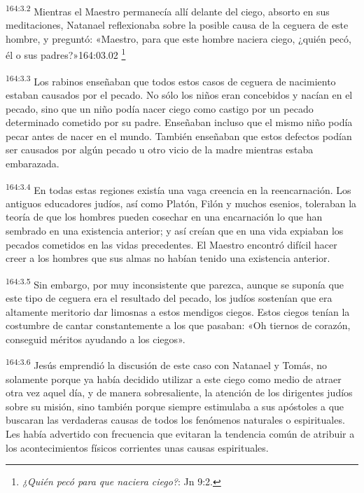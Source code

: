 \par 
\textsuperscript{164:3.2} Mientras el Maestro permanecía allí delante del ciego, absorto en sus meditaciones, Natanael reflexionaba sobre la posible causa de la ceguera de este hombre, y preguntó: «Maestro, para que este hombre naciera ciego, ¿quién pecó, él o sus padres?»164:03.02 \footnote{\textit{¿Quién pecó para que naciera ciego?}: Jn 9:2.}

\par 
\textsuperscript{164:3.3} Los rabinos enseñaban que todos estos casos de ceguera de nacimiento estaban causados por el pecado. No sólo los niños eran concebidos y nacían en el pecado, sino que un niño podía nacer ciego como castigo por un pecado determinado cometido por su padre. Enseñaban incluso que el mismo niño podía pecar antes de nacer en el mundo. También enseñaban que estos defectos podían ser causados por algún pecado u otro vicio de la madre mientras estaba embarazada.

\par 
\textsuperscript{164:3.4} En todas estas regiones existía una vaga creencia en la reencarnación. Los antiguos educadores judíos, así como Platón, Filón y muchos esenios, toleraban la teoría de que los hombres pueden cosechar en una encarnación lo que han sembrado en una existencia anterior; y así creían que en una vida expiaban los pecados cometidos en las vidas precedentes. El Maestro encontró difícil hacer creer a los hombres que sus almas no habían tenido una existencia anterior.

\par 
\textsuperscript{164:3.5} Sin embargo, por muy inconsistente que parezca, aunque se suponía que este tipo de ceguera era el resultado del pecado, los judíos sostenían que era altamente meritorio dar limosnas a estos mendigos ciegos. Estos ciegos tenían la costumbre de cantar constantemente a los que pasaban: «Oh tiernos de corazón, conseguid méritos ayudando a los ciegos».

\par 
\textsuperscript{164:3.6} Jesús emprendió la discusión de este caso con Natanael y Tomás, no solamente porque ya había decidido utilizar a este ciego como medio de atraer otra vez aquel día, y de manera sobresaliente, la atención de los dirigentes judíos sobre su misión, sino también porque siempre estimulaba a sus apóstoles a que buscaran las verdaderas causas de todos los fenómenos naturales o espirituales. Les había advertido con frecuencia que evitaran la tendencia común de atribuir a los acontecimientos físicos corrientes unas causas espirituales.

